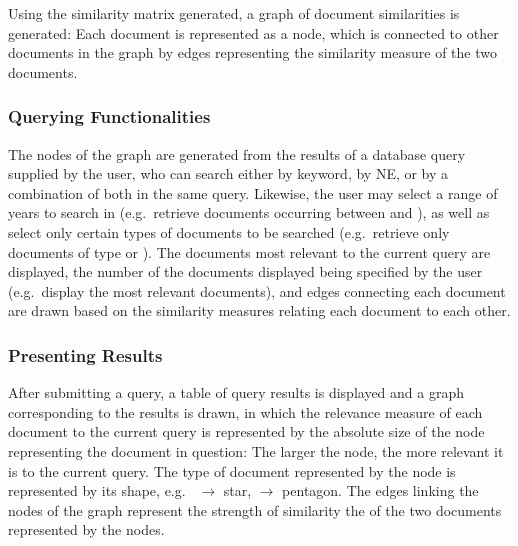 
Using the similarity matrix generated, a graph of document similarities is generated: Each document is represented as a node, which is connected to other documents in the graph by edges representing the similarity measure of the two documents.

\subsubsection {Querying Functionalities}
\label{sec:querying_functionalities}
The nodes of the graph are generated from the results of a database query supplied by the user, who can search either by keyword, by NE, or by a combination of both in the same query. Likewise, the user may select a range of years to search in (e.g.\ retrieve documents occurring between  and ), as well as select only certain types of documents to be searched (e.g.\ retrieve only documents of type  or ). The documents most relevant to the current query are displayed, the number of the documents displayed being specified by the user (e.g.\ display the  most relevant documents), and edges connecting each document are drawn based on the similarity measures relating each document to each other.

\subsubsection {Presenting Results}
\label{sec:presenting_results}
After submitting a query, a table of query results is displayed and a graph corresponding to the results is drawn, in which the relevance measure of each document to the current query is represented by the absolute size of the node representing the document in question: The larger the node, the more relevant it is to the current query. The type of document represented by the node is represented by its shape, e.g.\  $\rightarrow$ star,  $\rightarrow$ pentagon. The edges linking the nodes of the graph represent the strength of similarity the of the two documents represented by the nodes.